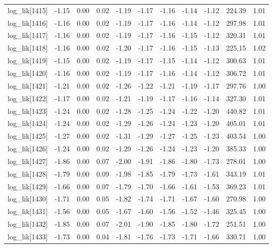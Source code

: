 \begin{table}[ht]
\begin{tabular}{rrrrrrrrrrr}
  log\_lik[1415] & -1.15 & 0.00 & 0.02 & -1.19 & -1.17 & -1.16 & -1.14 & -1.12 & 224.39 & 1.01 \\ 
  log\_lik[1416] & -1.16 & 0.00 & 0.02 & -1.19 & -1.17 & -1.16 & -1.14 & -1.12 & 297.98 & 1.01 \\ 
  log\_lik[1417] & -1.16 & 0.00 & 0.02 & -1.19 & -1.17 & -1.16 & -1.15 & -1.12 & 320.31 & 1.01 \\ 
  log\_lik[1418] & -1.16 & 0.00 & 0.02 & -1.20 & -1.17 & -1.16 & -1.15 & -1.13 & 225.15 & 1.02 \\ 
  log\_lik[1419] & -1.15 & 0.00 & 0.02 & -1.19 & -1.17 & -1.15 & -1.14 & -1.12 & 300.63 & 1.01 \\ 
  log\_lik[1420] & -1.16 & 0.00 & 0.02 & -1.19 & -1.17 & -1.16 & -1.14 & -1.12 & 306.72 & 1.01 \\ 
  log\_lik[1421] & -1.21 & 0.00 & 0.02 & -1.26 & -1.22 & -1.21 & -1.19 & -1.17 & 297.76 & 1.00 \\ 
  log\_lik[1422] & -1.17 & 0.00 & 0.02 & -1.21 & -1.19 & -1.17 & -1.16 & -1.14 & 327.30 & 1.01 \\ 
  log\_lik[1423] & -1.24 & 0.00 & 0.02 & -1.28 & -1.25 & -1.24 & -1.22 & -1.20 & 440.82 & 1.01 \\ 
  log\_lik[1424] & -1.24 & 0.00 & 0.02 & -1.29 & -1.26 & -1.24 & -1.23 & -1.20 & 405.01 & 1.01 \\ 
  log\_lik[1425] & -1.27 & 0.00 & 0.02 & -1.31 & -1.29 & -1.27 & -1.25 & -1.23 & 403.54 & 1.00 \\ 
  log\_lik[1426] & -1.24 & 0.00 & 0.02 & -1.29 & -1.26 & -1.24 & -1.23 & -1.20 & 385.33 & 1.00 \\ 
  log\_lik[1427] & -1.86 & 0.00 & 0.07 & -2.00 & -1.91 & -1.86 & -1.80 & -1.73 & 278.01 & 1.00 \\ 
  log\_lik[1428] & -1.79 & 0.00 & 0.09 & -1.98 & -1.85 & -1.79 & -1.73 & -1.61 & 343.19 & 1.01 \\ 
  log\_lik[1429] & -1.66 & 0.00 & 0.07 & -1.79 & -1.70 & -1.66 & -1.61 & -1.53 & 369.23 & 1.01 \\ 
  log\_lik[1430] & -1.71 & 0.00 & 0.05 & -1.82 & -1.74 & -1.71 & -1.67 & -1.60 & 270.98 & 1.00 \\ 
  log\_lik[1431] & -1.56 & 0.00 & 0.05 & -1.67 & -1.60 & -1.56 & -1.52 & -1.46 & 325.45 & 1.00 \\ 
  log\_lik[1432] & -1.85 & 0.00 & 0.07 & -2.01 & -1.90 & -1.85 & -1.80 & -1.72 & 251.51 & 1.00 \\ 
  log\_lik[1433] & -1.73 & 0.00 & 0.04 & -1.81 & -1.76 & -1.73 & -1.71 & -1.66 & 330.71 & 1.00 \\ 

\end{tabular}
\end{table}
